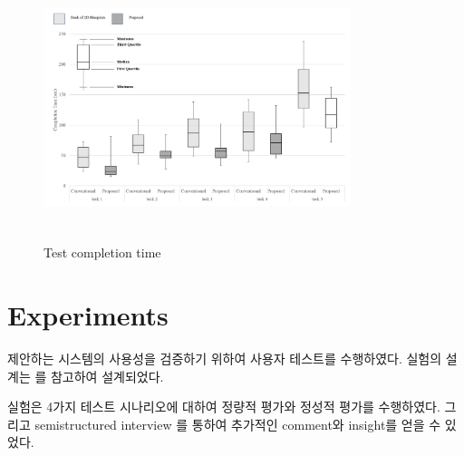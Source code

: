


 \begin{figure}[!t]
\centering
\includegraphics[width=0.8\textwidth, height=7.8cm]{5-Experiments/completion_time}
\caption{Test completion time}
\label{fig:completion_time}
\end{figure}

\section{Experiments}
제안하는 시스템의 사용성을 검증하기 위하여 사용자 테스트를 수행하였다. 실험의 설계는 \cite{song_penlight:_2009, yeh_-site_2012}를 참고하여 설계되었다. %


실험은 4가지 테스트 시나리오에 대하여 정량적 평가와 정성적 평가를 수행하였다. 그리고 semistructured interview 를 통하여 추가적인 comment와 insight를 얻을 수 있었다.   %




